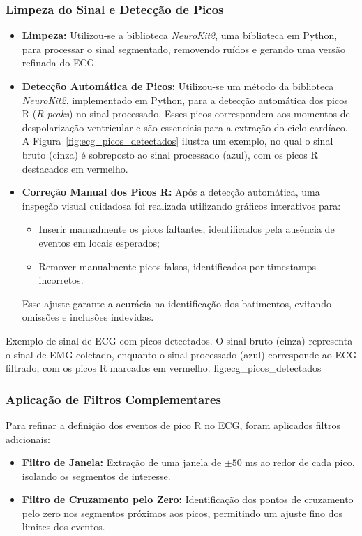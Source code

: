 \subsubsection{Limpeza do Sinal e Detecção de Picos}
\begin{itemize}
    \item \textbf{Limpeza:} Utilizou-se a biblioteca \textit{NeuroKit2}, uma biblioteca em Python, para processar o sinal segmentado, removendo ruídos e gerando uma versão refinada do ECG.
    \item \textbf{Detecção Automática de Picos:} Utilizou-se um método da biblioteca \textit{NeuroKit2}, implementado em Python, para a detecção automática dos picos R (\textit{R-peaks}) no sinal processado. Esses picos correspondem aos momentos de despolarização ventricular e são essenciais para a extração do ciclo cardíaco. A Figura~\ref{fig:ecg_picos_detectados} ilustra um exemplo, no qual o sinal bruto (cinza) é sobreposto ao sinal processado (azul), com os picos R destacados em vermelho.
    \item \textbf{Correção Manual dos Picos R:} Após a detecção automática, uma inspeção visual cuidadosa foi realizada utilizando gráficos interativos para:
    \begin{itemize}
        \item Inserir manualmente os picos faltantes, identificados pela ausência de eventos em locais esperados;
        \item Remover manualmente picos falsos, identificados por timestamps incorretos.
    \end{itemize}
    Esse ajuste garante a acurácia na identificação dos batimentos, evitando omissões e inclusões indevidas.
\end{itemize}


{Exemplo de sinal de ECG com picos detectados. O sinal bruto (cinza) representa o sinal de EMG coletado, enquanto o sinal processado (azul) corresponde ao ECG filtrado, com os picos R marcados em vermelho.}
{fig:ecg_picos_detectados}


\subsubsection{Aplicação de Filtros Complementares}
Para refinar a definição dos eventos de pico R no ECG, foram aplicados filtros adicionais:
\begin{itemize}
    \item \textbf{Filtro de Janela:} Extração de uma janela de \(\pm50\) ms ao redor de cada pico, isolando os segmentos de interesse.
    \item \textbf{Filtro de Cruzamento pelo Zero:} Identificação dos pontos de cruzamento pelo zero nos segmentos próximos aos picos, permitindo um ajuste fino dos limites dos eventos.
\end{itemize}

